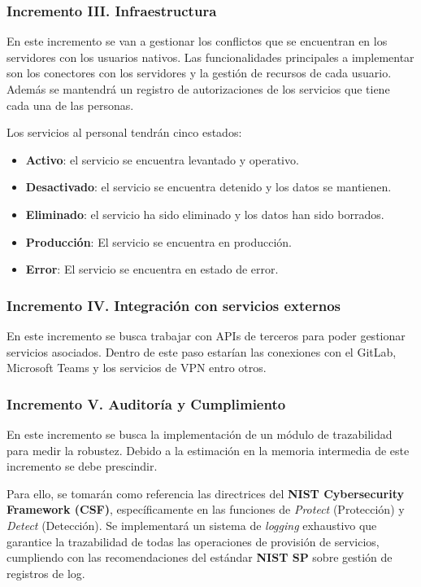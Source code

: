 \subsubsection{Incremento III. Infraestructura}

En este incremento se van a gestionar los conflictos que se encuentran en los servidores con los usuarios nativos. Las funcionalidades principales a implementar son los conectores con los servidores y la gestión de recursos de cada usuario. Además se mantendrá un registro de autorizaciones de los servicios que tiene cada una de las personas. 

Los servicios al personal tendrán cinco estados: 

\begin{itemize}
  \item \textbf{Activo}: el servicio se encuentra levantado y operativo.
  \item \textbf{Desactivado}: el servicio se encuentra detenido y los datos se mantienen.
  \item \textbf{Eliminado}: el servicio ha sido eliminado y los datos han sido borrados.
  \item \textbf{Producción}: El servicio se encuentra en producción.
  \item \textbf{Error}: El servicio se encuentra en estado de error.
\end{itemize}


\subsubsection{Incremento IV. Integración con servicios externos}

En este incremento se busca trabajar con APIs de terceros para poder gestionar servicios asociados. Dentro de este paso estarían las conexiones con el GitLab, Microsoft Teams y los servicios de VPN entro otros.


\subsubsection{Incremento V. Auditoría y Cumplimiento}
En este incremento se busca la implementación de un módulo de trazabilidad para medir la robustez. Debido a la estimación en la memoria intermedia de este incremento se debe prescindir. 

Para ello, se tomarán como referencia las directrices del \textbf{NIST Cybersecurity Framework (CSF)}, específicamente en las funciones de \textit{Protect} (Protección) y \textit{Detect} (Detección). Se implementará un sistema de \textit{logging} exhaustivo que garantice la trazabilidad de todas las operaciones de provisión de servicios, cumpliendo con las recomendaciones del estándar \textbf{NIST SP} sobre gestión de registros de log. \cite{nist_csf}

